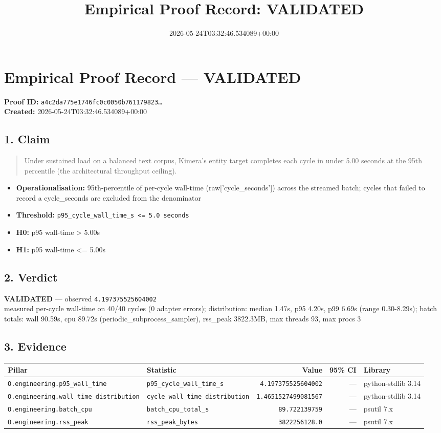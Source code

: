 \documentclass{article}
\title{Empirical Proof Record: VALIDATED}
\date{2026-05-24T03:32:46.534089+00:00}
\begin{document}
\maketitle
\section*{Empirical Proof Record --- \textcolor{validated}{\textbf{VALIDATED}}}
\textbf{Proof ID:} \texttt{a4c2da775e1746fc0c0050b761179823\dots}\\
\textbf{Created:} 2026-05-24T03:32:46.534089+00:00
\subsection*{1. Claim}
\begin{quote}Under sustained load on a balanced text corpus, Kimera's entity target completes each cycle in under 5.00 seconds at the 95th percentile (the architectural throughput ceiling).\end{quote}
\begin{itemize}
\item \textbf{Operationalisation:} 95th-percentile of per-cycle wall-time (raw['cycle\_seconds']) across the streamed batch; cycles that failed to record a cycle\_seconds are excluded from the denominator
\item \textbf{Threshold:} \texttt{p95\_cycle\_wall\_time\_s <= 5.0 seconds}
\item \textbf{H0:} p95 wall-time > 5.00s
\item \textbf{H1:} p95 wall-time <= 5.00s
\end{itemize}
\subsection*{2. Verdict}
\textcolor{validated}{\textbf{VALIDATED}} --- observed \texttt{4.197375525604002}\\
measured per-cycle wall-time on 40/40 cycles (0 adapter errors); distribution: median 1.47s, p95 4.20s, p99 6.69s (range 0.30-8.29s); batch totals: wall 90.59s, cpu 89.72s (periodic\_subprocess\_sampler), rss\_peak 3822.3MB, max threads 93, max procs 3
\subsection*{3. Evidence}
\begin{tabular}{llrrl}\toprule
\textbf{Pillar} & \textbf{Statistic} & \textbf{Value} & \textbf{95\% CI} & \textbf{Library} \\\midrule
\texttt{O.engineering.p95\_wall\_time} & \texttt{p95\_cycle\_wall\_time\_s} & \texttt{4.197375525604002} & --- & python-stdlib 3.14 \\
\texttt{O.engineering.wall\_time\_distribution} & \texttt{cycle\_wall\_time\_distribution} & \texttt{1.4651527499081567} & --- & python-stdlib 3.14 \\
\texttt{O.engineering.batch\_cpu} & \texttt{batch\_cpu\_total\_s} & \texttt{89.722139759} & --- & psutil 7.x \\
\texttt{O.engineering.rss\_peak} & \texttt{rss\_peak\_bytes} & \texttt{3822256128.0} & --- & psutil 7.x \\
\bottomrule\end{tabular}
\end{document}
